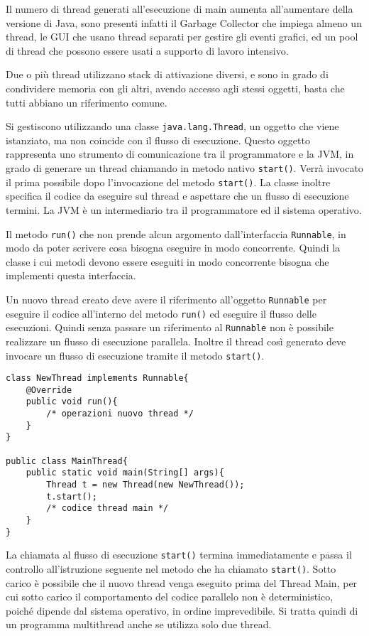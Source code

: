 \documentclass{article}
\numberwithin{equation}{subsection}
\begin{document}
Il numero di thread generati all'esecuzione di main aumenta all'aumentare della versione di Java, sono presenti infatti il Garbage Collector che impiega almeno un thread, le GUI che 
usano thread separati per gestire gli eventi grafici, ed un pool di thread che possono essere usati a supporto di lavoro intensivo. 

Due o più thread utilizzano stack di attivazione diversi, e sono in grado di condividere memoria con gli altri, avendo accesso agli stessi oggetti, basta che tutti abbiano 
un riferimento comune. 


Si gestiscono utilizzando una classe \verb|java.lang.Thread|, un oggetto che viene istanziato, ma non coincide con il flusso di esecuzione. Questo oggetto rappresenta uno 
strumento di comunicazione tra il programmatore e la JVM, in grado di generare un thread chiamando in metodo nativo \verb|start()|. Verrà invocato il prima possibile dopo 
l'invocazione del metodo \verb|start()|. La classe inoltre specifica il codice da eseguire sul thread e aspettare che un flusso di esecuzione termini. 
La JVM è un intermediario tra il programmatore ed il sistema operativo. 

Il metodo \verb|run()| che non prende alcun argomento dall'interfaccia \verb|Runnable|, in modo da poter scrivere cosa bisogna eseguire in modo concorrente. Quindi la classe 
i cui metodi devono essere eseguiti in modo concorrente bisogna che implementi questa interfaccia. 

Un nuovo thread creato deve avere il riferimento all'oggetto \verb|Runnable| per eseguire il codice all'interno del metodo \verb|run()| ed eseguire il flusso delle 
esecuzioni. 
Quindi senza passare un riferimento al \verb|Runnable| non è possibile realizzare un flusso di esecuzione parallela. Inoltre il thread così generato deve invocare un 
flusso di esecuzione tramite il metodo \verb|start()|. 
\begin{verbatim}
class NewThread implements Runnable{
    @Override 
    public void run(){
        /* operazioni nuovo thread */
    }
}

public class MainThread{
    public static void main(String[] args){
        Thread t = new Thread(new NewThread());
        t.start();
        /* codice thread main */
    }
}
\end{verbatim}

La chiamata al flusso di esecuzione \verb|start()| termina immediatamente e passa il controllo all'istruzione seguente nel metodo che ha chiamato \verb|start()|. 
Sotto carico è possibile che il nuovo thread venga eseguito prima del Thread Main, per cui sotto carico il comportamento del codice parallelo non è deterministico, poiché 
dipende dal sistema operativo, in ordine imprevedibile. 
Si tratta quindi di un programma multithread anche se utilizza solo due thread. 
\end{document}

